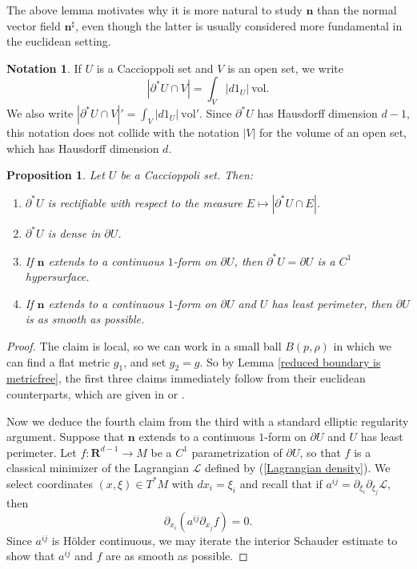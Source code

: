 \documentclass[reqno,12pt,letterpaper]{amsart}
\newcommand{\RR}{\mathbf{R}}
\newcommand{\normal}{\mathbf n}
\newcommand{\vol}{\mathrm{vol}}
\newtheorem{proposition}[theorem]{Proposition}
\theoremstyle{definition}
\newtheorem{notation}[theorem]{Notation}
\numberwithin{equation}{section}
\begin{document}
The above lemma motivates why it is more natural to study $\normal$ than the normal vector field $\normal^\sharp$, even though the latter is usually considered more fundamental in the euclidean setting.

\begin{notation}
If $U$ is a Caccioppoli set and $V$ is an open set, we write
$$|\partial^* U \cap V| = \int_V |d1_U| ~\vol.$$
We also write $|\partial^* U \cap V|' = \int_V |d1_U| ~\vol'$.
Since $\partial^* U$ has Hausdorff dimension $d - 1$, this notation does not collide with the notation $|V|$ for the volume of an open set, which has Hausdorff dimension $d$.
\end{notation}

\begin{proposition}\label{regularity of reduced boundary}
Let $U$ be a Caccioppoli set.
Then:
\begin{enumerate}
\item $\partial^* U$ is rectifiable with respect to the measure $E \mapsto |\partial^* U \cap E|$.
\item $\partial^* U$ is dense in $\partial U$.
\item If $\normal$ extends to a continuous $1$-form on $\partial U$, then $\partial^* U = \partial U$ is a $C^1$ hypersurface.
\item If $\normal$ extends to a continuous $1$-form on $\partial U$ and $U$ has least perimeter, then $\partial U$ is as smooth as possible.
\end{enumerate}
\end{proposition}
\begin{proof}
The claim is local, so we can work in a small ball $B(p, \rho)$ in which we can find a flat metric $g_1$, and set $g_2 = g$.
So by Lemma \ref{reduced boundary is metricfree}, the first three claims immediately follow from their euclidean counterparts, which are given in \cite[Chapter 4]{Giusti77} or \cite{deGiorgi55}.

Now we deduce the fourth claim from the third with a standard elliptic regularity argument.
Suppose that $\normal$ extends to a continuous $1$-form on $\partial U$ and $U$ has least perimeter.
Let $f: \RR^{d - 1} \to M$ be a $C^1$ parametrization of $\partial U$, so that $f$ is a classical minimizer of the Lagrangian $\mathscr L$ defined by (\ref{Lagrangian density}).
We select coordinates $(x, \xi) \in T^* M$ with $dx_i = \xi_i$ and recall that if $a^{ij} = \partial_{\xi_i} \partial_{\xi_j}\mathscr L$, then
\begin{equation}\label{elliptic PDE}
\partial_{x_i} (a^{ij} \partial_{x_j} f) = 0.
\end{equation}
Since $a^{ij}$ is H\"older continuous, we may iterate the interior Schauder estimate \cite[Theorem 6.22]{gilbarg2015elliptic} to show that $a^{ij}$ and $f$ are as smooth as possible.
\end{proof}
\end{document}
